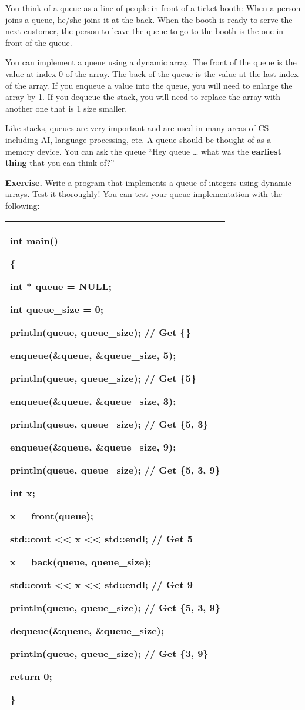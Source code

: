 \documentclass[
]{article}
\begin{document}
You think of a queue as a line of people in front of a ticket booth:
When a person joins a queue, he/she joins it at the back. When the booth
is ready to serve the next customer, the person to leave the queue to go
to the booth is the one in front of the queue.

You can implement a queue using a dynamic array. The front of the queue
is the value at index 0 of the array. The back of the queue is the value
at the last index of the array. If you enqueue a value into the queue,
you will need to enlarge the array by 1. If you dequeue the stack, you
will need to replace the array with another one that is 1 size smaller.

Like stacks, queues are very important and are used in many areas of CS
including AI, language processing, etc. A queue should be thought of as
a memory device. You can ask the queue ``Hey queue \ldots{} what was the
\textbf{earliest thing} that you can think of?''

\textbf{Exercise.} Write a program that implements a queue of integers
using dynamic arrays. Test it thoroughly! You can test your queue
implementation with the following:

\begin{longtable}[]{@{}l@{}}
\toprule
\endhead
\begin{minipage}[t]{0.97\columnwidth}\raggedright
int main()

\{

int * queue = NULL;

int queue\_size = 0;

println(queue, queue\_size); // Get \{\}

enqueue(\&queue, \&queue\_size, 5);

println(queue, queue\_size); // Get \{5\}

enqueue(\&queue, \&queue\_size, 3);

println(queue, queue\_size); // Get \{5, 3\}

enqueue(\&queue, \&queue\_size, 9);

println(queue, queue\_size); // Get \{5, 3, 9\}

int x;

x = front(queue);

std::cout \textless\textless{} x \textless\textless{} std::endl; // Get
5

x = back(queue, queue\_size);

std::cout \textless\textless{} x \textless\textless{} std::endl; // Get
9

println(queue, queue\_size); // Get \{5, 3, 9\}

dequeue(\&queue, \&queue\_size);

println(queue, queue\_size); // Get \{3, 9\}

return 0;

\}\strut
\end{minipage}\tabularnewline
\bottomrule
\end{longtable}
\end{document}
